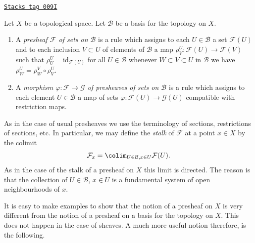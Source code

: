 \begin{definition}
\label{sheaves-definition-presheaf-basis}
\href{https://stacks.math.columbia.edu/tag/009I}{\texttt{Stacks tag 009I}}

Let $X$ be a topological space. Let $\mathcal{B}$ be a
basis for the topology on $X$.
\begin{enumerate}
\item A {\it presheaf $\mathcal{F}$ of sets on $\mathcal{B}$}
is a rule which assigns to each $U \in \mathcal{B}$ a set
$\mathcal{F}(U)$ and to each inclusion $V \subset U$
of elements of $\mathcal{B}$ a map
$\rho^U_V : \mathcal{F}(U) \to \mathcal{F}(V)$ such that
$\rho^U_U = \text{id}_{\mathcal{F}(U)}$ for all $U \in \mathcal{B}$
whenever $W \subset V \subset U$ in $\mathcal{B}$ we have
$\rho^U_W = \rho^V_W \circ \rho ^U_V$.
\item A {\it morphism $\varphi : \mathcal{F} \to \mathcal{G}$
of presheaves of sets on $\mathcal{B}$} is a rule which assigns to each
element $U \in \mathcal{B}$ a map of sets $\varphi : \mathcal{F}(U)
\to \mathcal{G}(U)$ compatible with restriction maps.
\end{enumerate}
\end{definition}

As in the case of usual presheaves we use the terminology of sections,
restrictions of sections, etc. In particular, we may define the
{\it stalk} of $\mathcal{F}$ at a point $x \in X$ by the
colimit
$$
\mathcal{F}_x = \colim_{U\in \mathcal{B}, x\in U} \mathcal{F}(U).
$$
As in the case of the stalk of a presheaf on $X$ this limit is
directed. The reason is that the collection of $U\in \mathcal{B}$,
$x \in U$ is a fundamental system of open neighbourhoods of $x$.

\medskip\noindent
It is easy to make examples to show that the notion of a presheaf
on $X$ is very different from the notion of a presheaf on a basis
for the topology on $X$. This does not happen in the case of
sheaves. A much more useful notion therefore, is the following.

